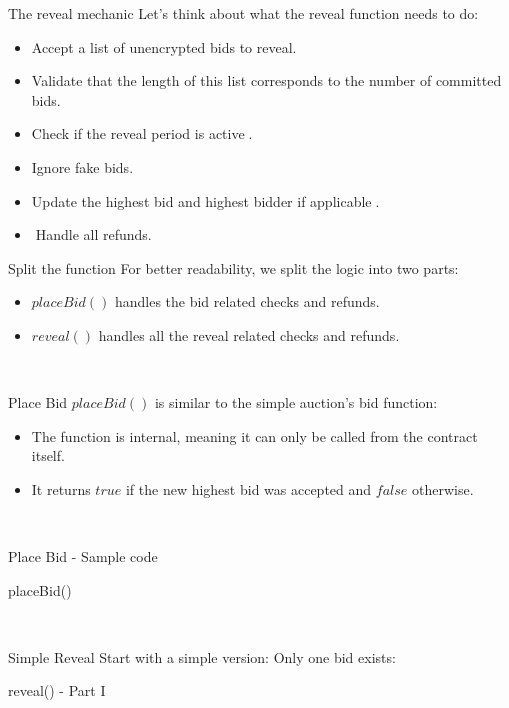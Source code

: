 \documentclass[]{beamer}
\begin{document}
\begin{frame}{The reveal mechanic}
	Let's think about what the reveal function needs to do:
	\begin{itemize}
		\item<2-> Accept a list of unencrypted bids to reveal.
		\item<3-> Validate that the length of this list corresponds to the number of committed bids.
		\item<4-> Check if the reveal period is active.
		\item<5-> Ignore fake bids.
		\item<6-> Update the highest bid and highest bidder if applicable.
		\item<7-> Handle all refunds.
	\end{itemize}
\end{frame}

\begin{frame}{Split the function}
For better readability, we split the logic into two parts:
	\begin{itemize}
		\item<2-> $placeBid()$ handles the bid related checks and refunds.
		\item<3-> $reveal()$ handles all the reveal related checks and refunds.
	\end{itemize}
\end{frame}

%
\begin{frame}{Place Bid}
$placeBid()$ is similar to the simple auction's bid function:
	\begin{itemize}
		\item<2-> The function is internal, meaning it can only be called from the contract itself.
		\item<3-> It returns $true$ if the new highest bid was accepted and $false$ otherwise.
	\end{itemize} 	
\end{frame}

%
\begin{frame}{Place Bid - Sample code}
	\begin{samplecode}{placeBid()}
		
	\end{samplecode}
\end{frame}
%

\begin{frame}{Simple Reveal}
Start with a simple version: Only one bid exists:
\vspace{.3cm}
	\begin{samplecode}{reveal() - Part I}
		
	\end{samplecode}
\end{frame}
\end{document}
